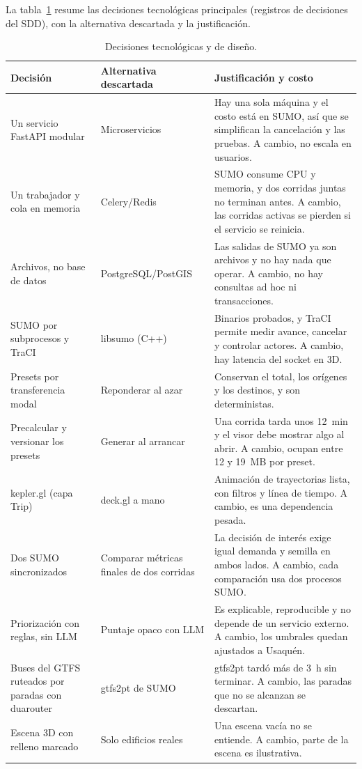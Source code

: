 La tabla~\ref{tab:decisiones} resume las decisiones tecnológicas principales (registros de decisiones del SDD), con la alternativa descartada y la justificación.

\begin{table}[ht]
\renewcommand{\arraystretch}{1.15}
\centering
\small
\begin{tabular}{|p{3.3cm}|p{3.4cm}|p{7.3cm}|}
\hline
\textbf{Decisión} & \textbf{Alternativa descartada} & \textbf{Justificación y costo} \\ \hline
Un servicio FastAPI modular & Microservicios & Hay una sola máquina y el costo está en SUMO, así que se simplifican la cancelación y las pruebas. A cambio, no escala en usuarios. \\ \hline
Un trabajador y cola en memoria & Celery/Redis & SUMO consume CPU y memoria, y dos corridas juntas no terminan antes. A cambio, las corridas activas se pierden si el servicio se reinicia. \\ \hline
Archivos, no base de datos & PostgreSQL/PostGIS & Las salidas de SUMO ya son archivos y no hay nada que operar. A cambio, no hay consultas ad hoc ni transacciones. \\ \hline
SUMO por subprocesos y TraCI & libsumo (C++) & Binarios probados, y TraCI permite medir avance, cancelar y controlar actores. A cambio, hay latencia del socket en 3D. \\ \hline
Presets por transferencia modal & Reponderar al azar & Conservan el total, los orígenes y los destinos, y son deterministas. \\ \hline
Precalcular y versionar los presets & Generar al arrancar & Una corrida tarda unos 12~min y el visor debe mostrar algo al abrir. A cambio, ocupan entre 12 y 19~MB por preset. \\ \hline
kepler.gl (capa Trip) & deck.gl a mano & Animación de trayectorias lista, con filtros y línea de tiempo. A cambio, es una dependencia pesada. \\ \hline
Dos SUMO sincronizados & Comparar métricas finales de dos corridas & La decisión de interés exige igual demanda y semilla en ambos lados. A cambio, cada comparación usa dos procesos SUMO. \\ \hline
Priorización con reglas, sin LLM & Puntaje opaco con LLM & Es explicable, reproducible y no depende de un servicio externo. A cambio, los umbrales quedan ajustados a Usaquén. \\ \hline
Buses del GTFS ruteados por paradas con duarouter & gtfs2pt de SUMO & gtfs2pt tardó más de 3~h sin terminar. A cambio, las paradas que no se alcanzan se descartan. \\ \hline
Escena 3D con relleno marcado & Solo edificios reales & Una escena vacía no se entiende. A cambio, parte de la escena es ilustrativa. \\ \hline
\end{tabular}
\caption{Decisiones tecnológicas y de diseño.}
\label{tab:decisiones}
\end{table}


